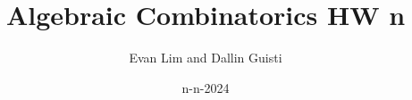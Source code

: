 \documentclass[11pt]{scrartcl}
\title{Algebraic Combinatorics HW n}
\author{Evan Lim and Dallin Guisti}
\date{n-n-2024}
\begin{document}
\maketitle
\setcounter{section}{1}
\begin{problem}[\textcolor{red}{}]
\end{problem}
\begin{soln}
\end{soln}
\end{document}
